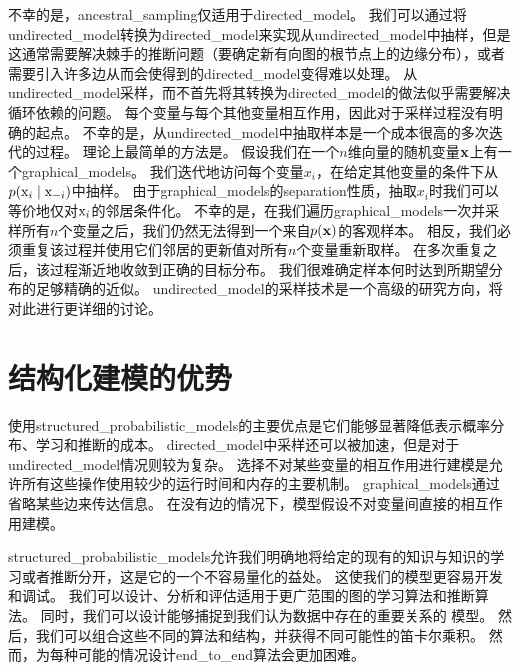 不幸的是，\gls{ancestral_sampling}仅适用于\gls{directed_model}。 
我们可以通过将\gls{undirected_model}转换为\gls{directed_model}来实现从\gls{undirected_model}中抽样，但是这通常需要解决棘手的推断问题（要确定新有向图的根节点上的边缘分布），或者需要引入许多边从而会使得到的\gls{directed_model}变得难以处理。
从\gls{undirected_model}采样，而不首先将其转换为\gls{directed_model}的做法似乎需要解决循环依赖的问题。 
每个变量与每个其他变量相互作用，因此对于采样过程没有明确的起点。
不幸的是，从\gls{undirected_model}中抽取样本是一个成本很高的多次迭代的过程。
理论上最简单的方法是。
假设我们在一个$n$维向量的随机变量$\mathbf{x}$上有一个\gls{graphical_models}。 
我们迭代地访问每个变量$x_i$，在给定其他变量的条件下从$p(\mathrm{x}_i \mid \mathrm{x}_{-i})$中抽样。
由于\gls{graphical_models}的\gls{separation}性质，抽取$x_i$时我们可以等价地仅对$\mathrm{x}_i$的邻居条件化。
不幸的是，在我们遍历\gls{graphical_models}一次并采样所有$n$个变量之后，我们仍然无法得到一个来自$p(\mathbf{x})$的客观样本。
相反，我们必须重复该过程并使用它们邻居的更新值对所有$n$个变量重新取样。
在多次重复之后，该过程渐近地收敛到正确的目标分布。
我们很难确定样本何时达到所期望分布的足够精确的近似。
\gls{undirected_model}的采样技术是一个高级的研究方向，将对此进行更详细的讨论。




\section{结构化建模的优势}
\label{sec:advantages_of_structured_modelling}


使用\gls{structured_probabilistic_models}的主要优点是它们能够显著降低表示概率分布、学习和推断的成本。
\gls{directed_model}中采样还可以被加速，但是对于\gls{undirected_model}情况则较为复杂。
选择不对某些变量的相互作用进行建模是允许所有这些操作使用较少的运行时间和内存的主要机制。
\gls{graphical_models}通过省略某些边来传达信息。
在没有边的情况下，模型假设不对变量间直接的相互作用建模。


\gls{structured_probabilistic_models}允许我们明确地将给定的现有的知识与知识的学习或者推断分开，这是它的一个不容易量化的益处。
这使我们的模型更容易开发和调试。 
我们可以设计、分析和评估适用于更广范围的图的学习算法和推断算法。
同时，我们可以设计能够捕捉到我们认为数据中存在的重要关系的
模型。
然后，我们可以组合这些不同的算法和结构，并获得不同可能性的笛卡尔乘积。
然而，为每种可能的情况设计\gls{end_to_end}算法会更加困难。



